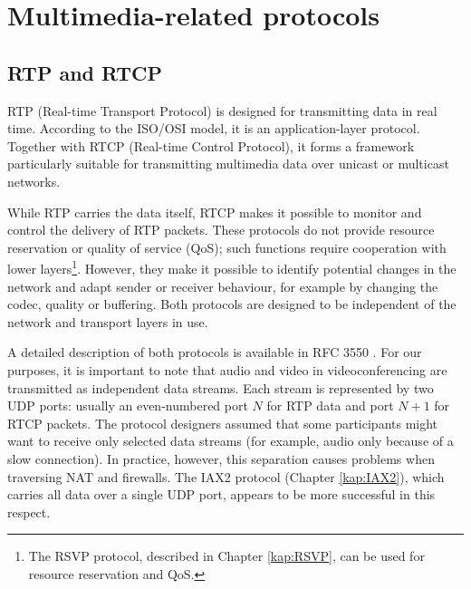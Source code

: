 \section{Multimedia-related protocols}\label{kap:Multimedia}

\subsection{RTP and RTCP}\label{kap:RTP+RTCP}
RTP (Real-time Transport Protocol) is designed for transmitting data in real time. According to the ISO/OSI model, it is an application-layer protocol. Together with RTCP (Real-time Control Protocol), it forms a framework particularly suitable for transmitting multimedia data over unicast or multicast networks.

While RTP carries the data itself, RTCP makes it possible to monitor and control the delivery of RTP packets. These protocols do not provide resource reservation or quality of service (QoS); such functions require cooperation with lower layers\footnote{The RSVP protocol, described in Chapter \ref{kap:RSVP}, can be used for resource reservation and QoS.}. However, they make it possible to identify potential changes in the network and adapt sender or receiver behaviour, for example by changing the codec, quality or buffering. Both protocols are designed to be independent of the network and transport layers in use.

A detailed description of both protocols is available in RFC 3550 \cite{RFC-3550-RTP-Protocol}. For our purposes, it is important to note that audio and video in videoconferencing are transmitted as independent data streams. Each stream is represented by two UDP ports: usually an even-numbered port $N$ for RTP data and port $N+1$ for RTCP packets. The protocol designers assumed that some participants might want to receive only selected data streams (for example, audio only because of a slow connection). In practice, however, this separation causes problems when traversing NAT and firewalls. The IAX2 protocol (Chapter \ref{kap:IAX2}), which carries all data over a single UDP port, appears to be more successful in this respect.

